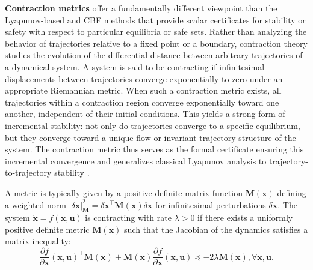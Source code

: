 \documentclass[Afour,sageh,times]{template/sagej}
\begin{document}


\textbf{Contraction metrics} offer a fundamentally different viewpoint than the  Lyapunov-based and CBF methods that provide scalar certificates for stability or safety with respect to particular equilibria or safe sets. Rather than analyzing the behavior of trajectories relative to a fixed point or a boundary, contraction theory studies the evolution of the differential distance between arbitrary trajectories of a dynamical system. A system is said to be contracting if infinitesimal displacements between trajectories converge exponentially to zero under an appropriate Riemannian metric. When such a contraction metric exists, all trajectories within a contraction region converge exponentially toward one another, independent of their initial conditions. This yields a strong form of incremental stability: not only do trajectories converge to a specific equilibrium, but they converge toward a unique flow or invariant trajectory structure of the system. The contraction metric thus serves as the formal certificate ensuring this incremental convergence and generalizes classical Lyapunov analysis to trajectory-to-trajectory stability \citep{liu2025certified, lohmiller1998contraction, slotine2003modular, manchester2017control}.

A metric is typically given by a positive definite matrix function $\boldsymbol{M}(\boldsymbol{x})$ defining a weighted norm $|\delta \boldsymbol{x}|_{\boldsymbol{M}}^2 = \delta \boldsymbol{x}^{\top} \boldsymbol{M}(\boldsymbol{x}) \delta \boldsymbol{x}$ for infinitesimal perturbations $\delta \boldsymbol{x}$. The system $\dot{\boldsymbol{x}} = f(\boldsymbol{x}, \boldsymbol{u})$ is contracting with rate $\lambda > 0$ if there exists a uniformly positive definite metric $\boldsymbol{M}(\boldsymbol{x})$ such that the Jacobian of the dynamics satisfies a matrix inequality:
\begin{equation}
    \frac{\partial f}{\partial \boldsymbol{x}} (\boldsymbol{x}, \boldsymbol{u})^{\top} \boldsymbol{M}(\boldsymbol{x}) + \boldsymbol{M}(\boldsymbol{x})\frac{\partial f}{\partial \boldsymbol{x}} (\boldsymbol{x}, \boldsymbol{u}) \preceq -2 \lambda \boldsymbol{M}(\boldsymbol{x}), \forall \boldsymbol{x}, \boldsymbol{u}.
\end{equation}
\end{document}
